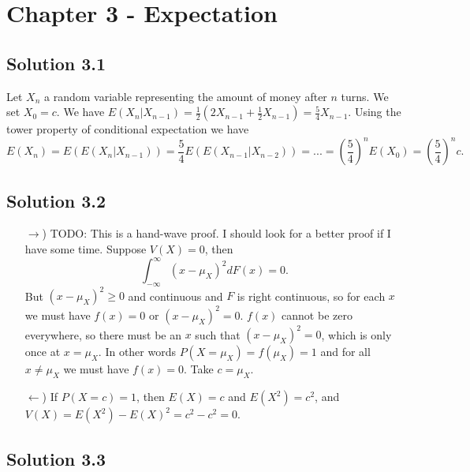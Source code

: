 \section*{Chapter 3 - Expectation}

\subsection*{Solution 3.1}

Let $X_n$ a random variable representing the amount of money after $n$ turns.
We set $X_0 = c$.
We have $E(X_n | X_{n-1}) = \frac{1}{2}(2 X_{n-1} + \frac{1}{2} X_{n-1}) = \frac{5}{4} X_{n-1}$.
Using the tower property of conditional expectation we have
\begin{equation*}
    E(X_n) = E(E(X_n | X_{n-1}))
        = \frac{5}{4} E(E(X_{n-1} | X_{n-2}))
        = ...
        = \left(\frac{5}{4}\right)^n E(X_0)
        = \left(\frac{5}{4}\right)^n c.
\end{equation*}


\subsection*{Solution 3.2}

\begin{itemize}
    \item[$\rightarrow$)] TODO: This is a hand-wave proof. I should look for a better proof if I have some time.
        Suppose $V(X) = 0$, then
        \begin{equation*}
            \int_{-\infty}^{\infty} (x - \mu_X)^2 dF(x) = 0.
        \end{equation*}
        But $(x - \mu_X)^2 \geq 0$ and continuous and $F$ is right continuous, so for each $x$ we must have $f(x) = 0$ or $(x - \mu_X)^2 = 0$.
        $f(x)$ cannot be zero everywhere, so there must be an $x$ such that $(x - \mu_X)^2 = 0$, which is only once at $x = \mu_X$.
        In other words $P(X = \mu_X) = f(\mu_X) = 1$ and for all $x \neq \mu_X$ we must have $f(x) = 0$.
        Take $c = \mu_X$.
    \item[$\leftarrow$)] If $P(X = c) = 1$, then $E(X) = c$ and $E(X^2) = c^2$, and $V(X) = E(X^2) - E(X)^2 = c^2 - c^2 = 0$.
\end{itemize}


\subsection*{Solution 3.3}

